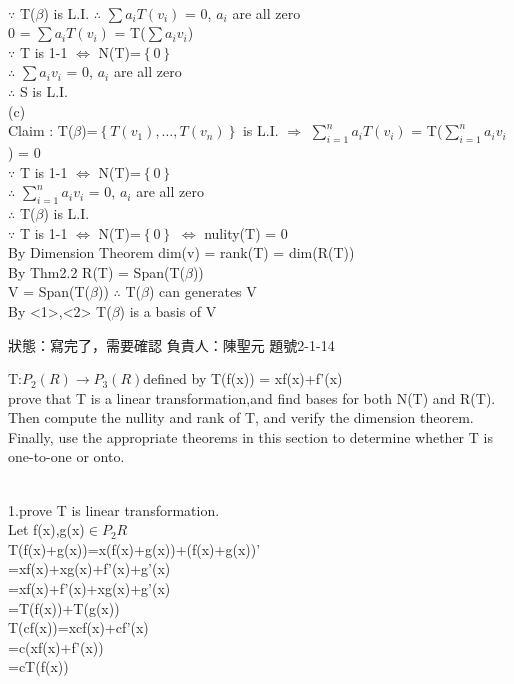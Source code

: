 \documentclass
[answers]
{exam}
\begin{document}
\begin{questions}
\begin{solution}
\\$\because$ T($\beta$) is L.I. $\therefore$ $\sum a_{i}T(v_{i})$ = 0, $a_{i}$ are all zero
\\ 0 = $\sum a_{i}T(v_{i})$ = T($\sum a_{i}v_{i}$)
\\$\because$ T is 1-1 $\Leftrightarrow $ N(T)=$\left\{0\right\}$
\\$\therefore$ $\sum a_{i}v_{i}$ = 0, $a_{i}$ are all zero
\\$\therefore$ S is L.I.
\\(c)
\\<1> Claim : T($\beta$)=$\left\{ T\left( v_{1}\right) ,\ldots ,T\left( v_{n}\right) \right\} $ is L.I. 
$\Rightarrow$ $\sum^{n}_{i=1}a_{i}T(v_{i})$ = T($\sum ^{n}_{i=1}a_{i}v_{i}$) = 0
\\$\because$ T is 1-1 $\Leftrightarrow $ N(T)=$\left\{0\right\}$
\\$\therefore$ $\sum^{n}_{i=1}a_{i}v_{i}$ = 0, $a_{i}$ are all zero
\\$\therefore$ T($\beta$) is L.I.
\\<2>$\because$ T is 1-1 $\Leftrightarrow $ N(T)=$\left\{0\right\}$ $\Leftrightarrow $ nulity(T) = 0
\\By Dimension Theorem dim(v) = rank(T) = dim(R(T))
\\By Thm2.2  R(T) = Span(T($\beta$))
\\ V = Span(T($\beta$)) $\therefore$ T($\beta$) can generates V
\\By <1>,<2> T($\beta$) is a basis of V
\end{solution}
    \begin{tcolorbox}
    狀態：寫完了，需要確認  負責人：陳聖元    題號2-1-14
    \end{tcolorbox}
    \question 

T:$P_{2}(R)$$\rightarrow$$P_{3}(R)$defined by T(f(x)) = xf(x)+f'(x)\\prove that T is a linear transformation,and find bases for both N(T) and R(T). Then compute the nullity and rank of T, and verify the dimension theorem. Finally, use the appropriate theorems in this section to determine whether T is one-to-one or onto.


\begin{solution}\\
  1.prove T is linear transformation.\\
  Let f(x),g(x)$\in$$P_{2}R$\\
  T(f(x)+g(x))=x(f(x)+g(x))+(f(x)+g(x))'\\  
  =xf(x)+xg(x)+f'(x)+g'(x)\\  
  =xf(x)+f'(x)+xg(x)+g'(x)\\  
  =T(f(x))+T(g(x))\\
  T(cf(x))=xcf(x)+cf'(x)\\=c(xf(x)+f'(x))\\
  =cT(f(x))\\
  

\end{solution}
\end{questions}
\end{document}
